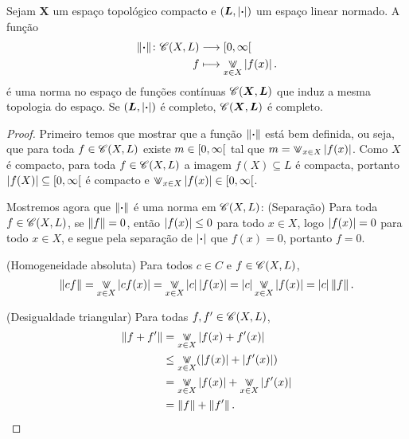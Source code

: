 \begin{proposition}
Sejam $\bm X$ um espaço topológico compacto e $(\bm L,\left\vert{\bm{\cdot}}\right\vert)$ um espaço linear normado. A função
	\begin{align*}
	\func{\nor{\var}}{\Cont(X,L)}{\intfa{0}{\infty}}{f}{\max_{x \in X} \abs{f(x)}.}
	\end{align*}
é uma norma no espaço de funções contínuas $\mathscr{C}(\bm X,\bm L)$ que induz a mesma topologia do espaço. Se $(\bm L,\left\vert{\bm{\cdot}}\right\vert)$ é completo, $\mathscr{C}(\bm X,\bm L)$ é completo.
\end{proposition}
\begin{proof}
Primeiro temos que mostrar que a função $\left\Vert{\bm{\cdot}}\right\Vert$ está bem definida, ou seja, que para toda $f \in \mathscr{C}(X,L)$ existe $m \in \left[{0},{\infty}\right[$ tal que $m = \max_{x \in X} \abs{f(x)}$. Como $X$ é compacto, para toda $f \in \mathscr{C}(X,L)$ a imagem $f(X) \subseteq L$ é compacta, portanto $\left\vert{f(X)}\right\vert \subseteq \left[{0},{\infty}\right[$ é compacto e $\max_{x \in X} \abs{f(x)} \in \intfa{0}{\infty}$.

Mostremos agora que $\left\Vert{\bm{\cdot}}\right\Vert$ é uma norma em $\mathscr{C}(X,L)$: (Separação) Para toda $f \in \mathscr{C}(X,L)$, se $\left\Vert{f}\right\Vert = 0$, então $\left\vert{f(x)}\right\vert \leq 0$ para todo $x \in X$, logo $\left\vert{f(x)}\right\vert = 0$ para todo $x \in X$, e segue pela separação de $\left\vert{\bm{\cdot}}\right\vert$ que $f(x)=0$, portanto $f=0$.

(Homogeneidade absoluta) Para todos $c \in C$ e $f \in \mathscr{C}(X,L)$,
	\begin{equation*}
	\nor{cf} = \max_{x \in X} \abs{cf(x)} = \max_{x \in X} \abs{c}\abs{f(x)} = \abs{c} \max_{x \in X} \abs{f(x)} = \abs{c}\nor{f}.
	\end{equation*}

(Desigualdade triangular) Para todas $f,f' \in \mathscr{C}(X,L)$,
	\begin{align*}
	\nor{f+f'} &= \max_{x \in X} \abs{f(x)+f'(x)} \\
		&\leq \max_{x \in X}(\abs{f(x)} + \abs{f'(x)}) \\
		&= \max_{x \in X} \abs{f(x)} + \max_{x \in X} \abs{f'(x)} \\
		&= \nor{f}+\nor{f'}.
	\end{align*}



\end{proof}
